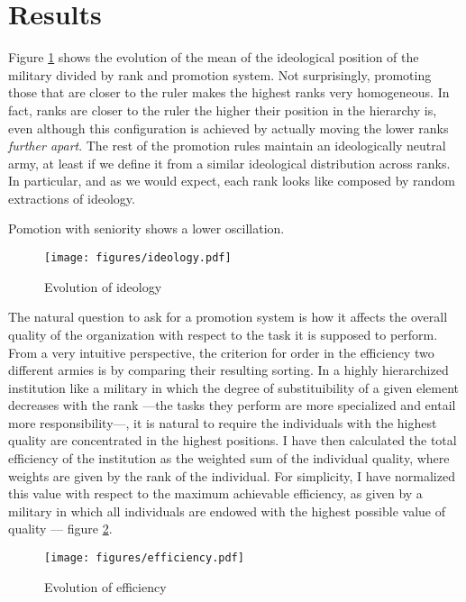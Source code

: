 \section{Results}
\label{sec:results}

Figure \ref{fig:ideology} shows the evolution of the mean of the ideological position of the military divided by rank
and promotion system. Not surprisingly, promoting those that are closer to the ruler makes the highest ranks very
homogeneous. In fact, ranks are closer to the ruler the higher their position in the hierarchy is, even although this
configuration is achieved by actually moving the lower ranks \emph{further apart}. The rest of the promotion rules
maintain an ideologically neutral army, at least if we define it from a similar ideological distribution across
ranks. In particular, and as we would expect, each rank looks like composed by random extractions of ideology.

Pomotion with seniority shows a lower oscillation.

\begin{figure}[!h]
  \centering
  \caption{Evolution of ideology}
  \texttt{[image: figures/ideology.pdf]}
  \label{fig:ideology}
\end{figure}

The natural question to ask for a promotion system is how it affects the overall quality of the organization with
respect to the task it is supposed to perform. From a very intuitive perspective, the criterion for order in the efficiency two
different armies is by comparing their resulting sorting. In a highly hierarchized
institution like a military in which the degree of substituibility of a given element decreases with the rank ---the
tasks they perform are more specialized and entail more responsibility---, it is natural to require the individuals with
the highest quality are concentrated in the highest positions. I have then calculated the total efficiency of the
institution as the weighted sum of the individual quality, where weights are given by the rank of the
individual. For simplicity, I have normalized this value with respect to the maximum achievable efficiency, as given by
a military in which all individuals are endowed with the highest possible value of quality --- figure \ref{fig:efficiency}.

\begin{figure}[!h]
  \centering
  \caption{Evolution of efficiency}
  \texttt{[image: figures/efficiency.pdf]}
  \label{fig:efficiency}
\end{figure}

